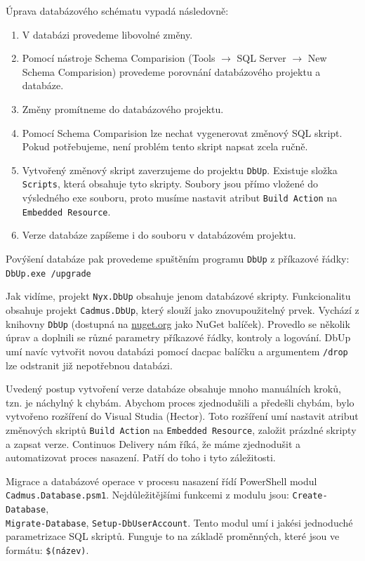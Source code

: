 Úprava databázového schématu vypadá následovně:

\begin{enumerate}
\item V databázi provedeme libovolné změny.
\item Pomocí nástroje Schema Comparision (Tools $\rightarrow$ SQL Server $\rightarrow$ New Schema Comparision) provedeme porovnání databázového projektu a databáze.
\item Změny promítneme do databázového projektu.
\item Pomocí Schema Comparision lze nechat vygenerovat změnový SQL skript. Pokud potřebujeme, není problém tento skript napsat zcela ručně.
\item Vytvořený změnový skript zaverzujeme do projektu \texttt{DbUp}. Existuje složka \texttt{Scripts}, která obsahuje tyto skripty. Soubory jsou přímo vložené do výsledného exe souboru, proto musíme nastavit atribut \texttt{Build Action} na \texttt{Embedded Resource}.
\item Verze databáze zapíšeme i do souboru v databázovém projektu.
\end{enumerate}

Povýšení databáze pak provedeme spuštěním programu \texttt{DbUp} z příkazové řádky: \texttt{DbUp.exe /upgrade}

Jak vidíme, projekt \texttt{Nyx.DbUp} obsahuje jenom databázové skripty. Funkcionalitu obsahuje projekt \texttt{Cadmus.DbUp}, který slouží jako znovupoužitelný prvek. Vychází z knihovny \texttt{DbUp} (dostupná na \url{nuget.org} jako NuGet balíček). Provedlo se několik úprav a doplnili se různé parametry příkazové řádky, kontroly a logování. DbUp umí navíc vytvořit novou databázi pomocí dacpac balíčku a argumentem \texttt{/drop} lze odstranit již nepotřebnou databázi. 

Uvedený postup vytvoření verze databáze obsahuje mnoho manuálních kroků, tzn. je náchylný k chybám. Abychom proces zjednodušili a předešli chybám, bylo vytvořeno rozšíření do Visual Studia (Hector). Toto rozšíření umí nastavit atribut změnových skriptů \texttt{Build Action} na \texttt{Embedded Resource}, založit prázdné skripty a zapsat verze. Continuos Delivery nám říká, že máme zjednodušit a automatizovat proces nasazení. Patří do toho i tyto záležitosti. 

Migrace a databázové operace v procesu nasazení řídí PowerShell modul\\ \texttt{Cadmus.Database.psm1}. Nejdůležitějšími funkcemi z modulu jsou: \texttt{Create-Database},\\ \texttt{Migrate-Database}, \texttt{Setup-DbUserAccount}. Tento modul umí i jakési jednoduché parametrizace SQL skriptů. Funguje to na základě proměnných, které jsou ve formátu: \texttt{\$(název)}.

